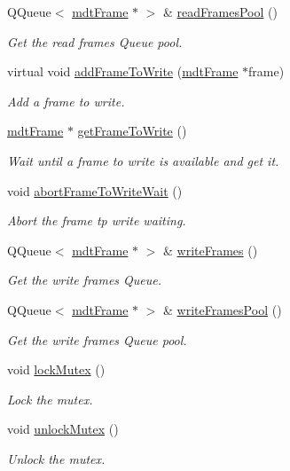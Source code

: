 \begin{DoxyCompactItemize}
Q\-Queue$<$ \hyperlink{classmdt_frame}{mdt\-Frame} $\ast$ $>$ \& \hyperlink{classmdt_abstract_port_a3850ab819a8fc5dad22af14b74c45274}{read\-Frames\-Pool} ()
\begin{DoxyCompactList}\small\item\em Get the read frames Queue pool. \end{DoxyCompactList}\item 
virtual void \hyperlink{classmdt_abstract_port_a9a69eb2fc07d551ab37c011487fa319d}{add\-Frame\-To\-Write} (\hyperlink{classmdt_frame}{mdt\-Frame} $\ast$frame)
\begin{DoxyCompactList}\small\item\em Add a frame to write. \end{DoxyCompactList}\item 
\hyperlink{classmdt_frame}{mdt\-Frame} $\ast$ \hyperlink{classmdt_abstract_port_a6c5ebd4451aec959efc4e71ab1b13941}{get\-Frame\-To\-Write} ()
\begin{DoxyCompactList}\small\item\em Wait until a frame to write is available and get it. \end{DoxyCompactList}\item 
void \hyperlink{classmdt_abstract_port_ae67c815f68317c70e398eaa86622af6b}{abort\-Frame\-To\-Write\-Wait} ()
\begin{DoxyCompactList}\small\item\em Abort the frame tp write waiting. \end{DoxyCompactList}\item 
Q\-Queue$<$ \hyperlink{classmdt_frame}{mdt\-Frame} $\ast$ $>$ \& \hyperlink{classmdt_abstract_port_a4fed10be147dfce6ca315467ff3fb968}{write\-Frames} ()
\begin{DoxyCompactList}\small\item\em Get the write frames Queue. \end{DoxyCompactList}\item 
Q\-Queue$<$ \hyperlink{classmdt_frame}{mdt\-Frame} $\ast$ $>$ \& \hyperlink{classmdt_abstract_port_abf093b67fddebffa4f3c52277b9a8cf7}{write\-Frames\-Pool} ()
\begin{DoxyCompactList}\small\item\em Get the write frames Queue pool. \end{DoxyCompactList}\item 
void \hyperlink{classmdt_abstract_port_a6bf2ecdcf894da3929a22eb8793a9fe3}{lock\-Mutex} ()
\begin{DoxyCompactList}\small\item\em Lock the mutex. \end{DoxyCompactList}\item 
void \hyperlink{classmdt_abstract_port_a3523c72a06e4d950338f91e56c286e84}{unlock\-Mutex} ()
\begin{DoxyCompactList}\small\item\em Unlock the mutex. \end{DoxyCompactList}\end{DoxyCompactItemize}
